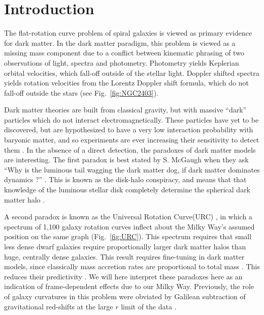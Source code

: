 \documentclass[reprint,%
 amsmath,amssymb,
 aps,
]{revtex4-1}
\begin{document}
\section{Introduction  \label{sec:uno}}



 The flat-rotation curve problem of spiral galaxies  is viewed as primary evidence for dark matter\cite{Rub,Bosma,1985ApJAlbada}. 
 In the dark matter paradigm, this problem is   viewed as a missing mass component due to a conflict between kinematic phrasing of  two      observations of light, spectra and photometry. Photometry yields Keplerian orbital velocities, which fall-off outside of the stellar light. Doppler shifted spectra yields rotation velocities from the Lorentz Doppler shift formula, which do not fall-off outside the stars  (see Fig.~\ref{fig:NGC2403}).  
 
 
 
Dark matter theories are built from classical gravity, but with massive
   ``dark'' particles  which do not interact electromagnetically.   These particles have   yet to be    discovered, but are hypothesized to have a very low interaction probability with baryonic matter, and so  experiments are ever increasing their sensitivity to detect them \cite{Cebrian:2022brv}. In the absence of a direct detection, the paradoxes of dark matter models are interesting. The first paradox is best stated by 
  S. McGaugh  when they ask   ``Why is the luminous tail wagging the dark matter dog,  if dark matter dominates dynamics ?'' \cite{1999McGaugh,McGaugh2016RAR}. This is known as the  disk-halo conspiracy, and means that 
that knowledge of 
 the luminous stellar   disk  completely determine the spherical dark matter halo \cite{2004ApJ...609..652M}.
 
 
 
 A second paradox  is known as  the Universal Rotation Curve(URC)  \cite{salucci,Persic,1978Rubin,10.1111/j.1365-2966.2007.11696.x}, in which  a spectrum of 1,100 galaxy rotation curves
 inflect  about  the Milky Way's assumed  position on the same graph    (Fig.~\ref{fig:URC}).  This spectrum requires that 
  small less dense  dwarf galaxies require   proportionally larger dark matter halos than   huge, centrally dense    galaxies. 
  This result requires fine-tuning in dark  matter models, since
  classically mass accretion rates are proportional to total mass \cite{10.1093/mnras/stt2403}.  This reduces their    predictivity   \cite{MCGAUGH2021220}.  We will here interpret these paradoxes here as an indication of  frame-dependent effects   due to our Milky Way. 
   Previously, the role of 
     galaxy curvatures  in this problem  were    obviated 
       by  Galilean subtraction of   gravitational red-shifts at the  large $r$  limit of the data \citep{MTW}. 
      
\end{document}

